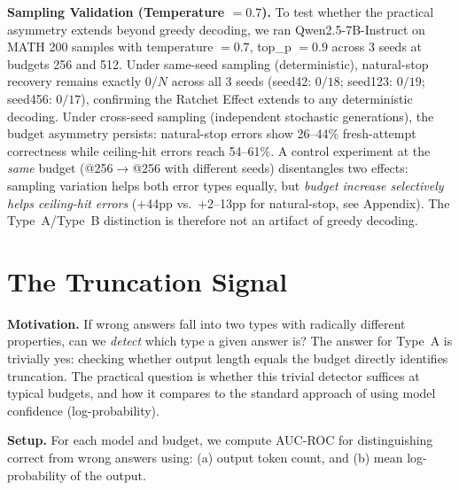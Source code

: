 \documentclass{article}
\begin{document}
\textbf{Sampling Validation (Temperature $= 0.7$).}
To test whether the practical asymmetry extends beyond greedy decoding, we ran Qwen2.5-7B-Instruct on MATH 200 samples with temperature $= 0.7$, top\_p $= 0.9$ across 3 seeds at budgets 256 and 512. Under same-seed sampling (deterministic), natural-stop recovery remains exactly $0/N$ across all 3 seeds (seed42: $0/18$; seed123: $0/19$; seed456: $0/17$), confirming the Ratchet Effect extends to any deterministic decoding. Under cross-seed sampling (independent stochastic generations), the budget asymmetry persists: natural-stop errors show 26--44\% fresh-attempt correctness while ceiling-hit errors reach 54--61\%. A control experiment at the \emph{same} budget (@256$\to$@256 with different seeds) disentangles two effects: sampling variation helps both error types equally, but \emph{budget increase selectively helps ceiling-hit errors} (+44pp vs.\ +2--13pp for natural-stop, see Appendix). The Type~A/Type~B distinction is therefore not an artifact of greedy decoding.

\section{The Truncation Signal}

\textbf{Motivation.}
If wrong answers fall into two types with radically different properties, can we \emph{detect} which type a given answer is? The answer for Type~A is trivially yes: checking whether output length equals the budget directly identifies truncation. The practical question is whether this trivial detector suffices at typical budgets, and how it compares to the standard approach of using model confidence (log-probability).

\textbf{Setup.}
For each model and budget, we compute AUC-ROC for distinguishing correct from wrong answers using: (a) output token count, and (b) mean log-probability of the output.
\end{document}
